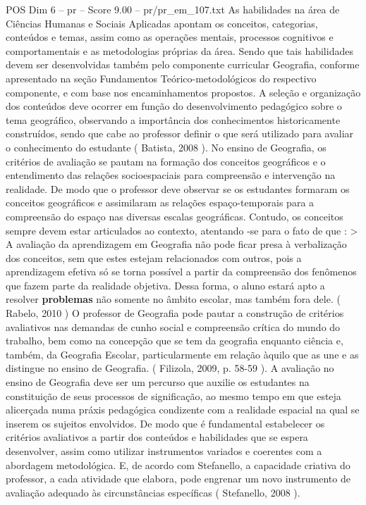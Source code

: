 \begin{textsample}{POS Dim 6 – pr – Score 9.00 – pr/pr\_em\_107.txt}
As habilidades na área de Ciências Humanas e Sociais Aplicadas apontam os conceitos, categorias, conteúdos e temas, assim como as operações mentais, processos cognitivos e comportamentais e as metodologias próprias da área.
Sendo que tais habilidades devem ser desenvolvidas também pelo componente curricular Geografia, conforme apresentado na seção Fundamentos Teórico-metodológicos do respectivo componente, e com base nos encaminhamentos propostos.
A seleção e organização dos conteúdos deve ocorrer em função do desenvolvimento pedagógico sobre o tema geográfico, observando a importância dos conhecimentos historicamente construídos, sendo que cabe ao professor definir o que será utilizado para avaliar o conhecimento do estudante ( Batista, 2008 ).
No ensino de Geografia, os critérios de avaliação se pautam na formação dos conceitos geográficos e o entendimento das relações socioespaciais para compreensão e intervenção na realidade.
De modo que o professor deve observar se os estudantes formaram os conceitos geográficos e assimilaram as relações espaço-temporais para a compreensão do espaço nas diversas escalas geográficas.
Contudo, os conceitos sempre devem estar articulados ao contexto, atentando -se para o fato de que : > A avaliação da aprendizagem em Geografia não pode ficar presa à verbalização dos conceitos, sem que estes estejam relacionados com outros, pois a aprendizagem efetiva só se torna possível a partir da compreensão dos fenômenos que fazem parte da realidade objetiva.
Dessa forma, o aluno estará apto a resolver \textbf{problemas} não somente no âmbito escolar, mas também fora dele. ( Rabelo, 2010 ) O professor de Geografia pode pautar a construção de critérios avaliativos nas demandas de cunho social e compreensão crítica do mundo do trabalho, bem como na concepção que se tem da geografia enquanto ciência e, também, da Geografia Escolar, particularmente em relação àquilo que as une e as distingue no ensino de Geografia. ( Filizola, 2009, p. 58-59 ).
A avaliação no ensino de Geografia deve ser um percurso que auxilie os estudantes na constituição de seus processos de significação, ao mesmo tempo em que esteja alicerçada numa práxis pedagógica condizente com a realidade espacial na qual se inserem os sujeitos envolvidos.
De modo que é fundamental estabelecer os critérios avaliativos a partir dos conteúdos e habilidades que se espera desenvolver, assim como utilizar instrumentos variados e coerentes com a abordagem metodológica.
E, de acordo com Stefanello, a capacidade criativa do professor, a cada atividade que elabora, pode engrenar um novo instrumento de avaliação adequado às circunstâncias específicas ( Stefanello, 2008 ).

\end{textsample}
